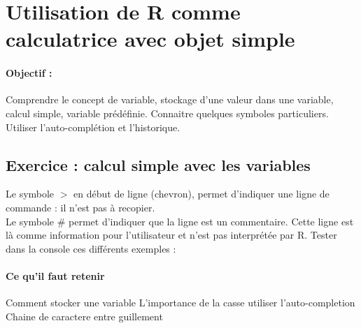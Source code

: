 \section{Utilisation de R comme calculatrice avec objet simple}
\paragraph{Objectif : } Comprendre le concept de variable, stockage d'une valeur dans une variable, calcul simple, variable prédéfinie. Connaitre quelques symboles particuliers. Utiliser l'auto-complétion et l'historique.
\subsection{Exercice : calcul simple avec les variables}
Le symbole $>$ en début de ligne (chevron), permet d'indiquer une ligne de commande : il n'est pas à recopier. \\
Le symbole \# permet d'indiquer que la ligne est un commentaire. Cette ligne est là comme information pour l'utilisateur et n'est pas interprétée par R.
Tester dans la console ces différents exemples :



\paragraph{Ce qu'il faut retenir}
Comment stocker une variable
L'importance de la casse
utiliser l'auto-completion
Chaine de caractere entre guillement


